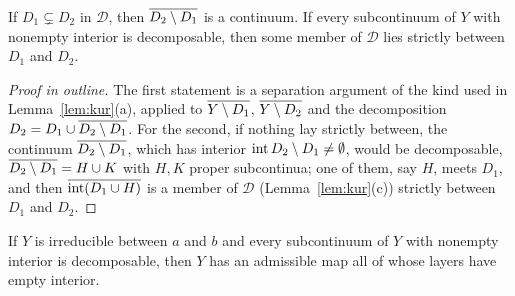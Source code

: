 \begin{proposition}\label{prop:no-jumps}
If $D_1\subsetneq D_2$ in $\mathcal D$, then $\overline{D_2\setminus D_1}$ is a continuum. If every subcontinuum of $Y$ with nonempty
interior is decomposable, then some member of $\mathcal D$ lies strictly between $D_1$ and $D_2$.
\end{proposition}

\begin{proof}[Proof in outline]
The first statement is a separation argument of the kind used in Lemma~\ref{lem:kur}(a), applied to
$\overline{Y\setminus D_1}$, $\overline{Y\setminus D_2}$ and the decomposition $D_2=D_1\cup\overline{D_2\setminus D_1}$. For the second, if nothing
lay strictly between, the continuum $\overline{D_2\setminus D_1}$, which has interior $\operatorname{int} D_2\setminus D_1\ne\emptyset$, would be
decomposable, $\overline{D_2\setminus D_1}=H\cup K$ with $H,K$ proper subcontinua; one of them, say $H$, meets $D_1$, and then
$\overline{\operatorname{int}(D_1\cup H)}$ is a member of $\mathcal D$ (Lemma~\ref{lem:kur}(c)) strictly between $D_1$ and $D_2$.
\end{proof}


\begin{theorem}\label{thm:scale}
If $Y$ is irreducible between $a$ and $b$ and every subcontinuum of $Y$ with nonempty interior is
decomposable, then $Y$ has an admissible map all of whose layers have empty interior.
\end{theorem}

